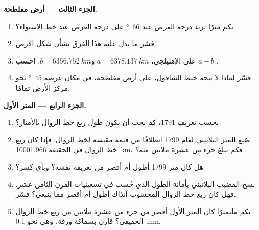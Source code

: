 \begin{problem}
\medskip
\noindent\textbf{الجزء الثالث --- أرض مفلطحة.}
\begin{enumerate}[resume]
  \item بكم مترًا تزيد درجة العرض عند \qty{66}{\degree} على درجة العرض
        عند خط الاستواء؟
  \item فسّر ما يدل عليه هذا الفرق بشأن شكل الأرض.
  \item على الإهليلجي، $a = \qty{6378.137}{km}$
        و$b = \qty{6356.752}{km}$. احسب $a - b$ .
  \item فسّر لماذا لا يتجه خيط الشاقول، على أرض مفلطحة، في مكان عرضه
        \qty{45}{\degree} نحو مركز الأرض
        تمامًا.
\end{enumerate}

\medskip
\noindent\textbf{الجزء الرابع --- المتر الأول.}
\begin{enumerate}[resume]
  \item بحسب تعريف 1791، كم يجب أن يكون طول ربع خط الزوال
        بالأمتار؟
  \item صُنع المتر البلاتيني لعام 1799 انطلاقًا من قيمة مقيسة لخط الزوال.
        فإذا كان ربع خط الزوال في الحقيقة \qty{10001.966}{km}، فكم يبلغ جزء
        من عشرة ملايين منه؟
  \item هل كان متر 1799 أطول أم أقصر من تعريفه نفسه؟ وبأي
        كسر؟
  \item نسخ القضيب البلاتيني بأمانة الطول الذي حُسب في تسعينيات القرن الثامن
        عشر. فهل كان ربع خط الزوال المحسوب آنذاك أطول أم أقصر مما ينبغي؟
        فسّر.
  \item بكم مليمترًا كان المتر الأول أقصر من جزء من عشرة ملايين من ربع خط
        الزوال الحقيقي؟ قارن بسماكة ورقة، وهي نحو
        \qty{0.1}{mm}.
\end{enumerate}
\end{problem}

